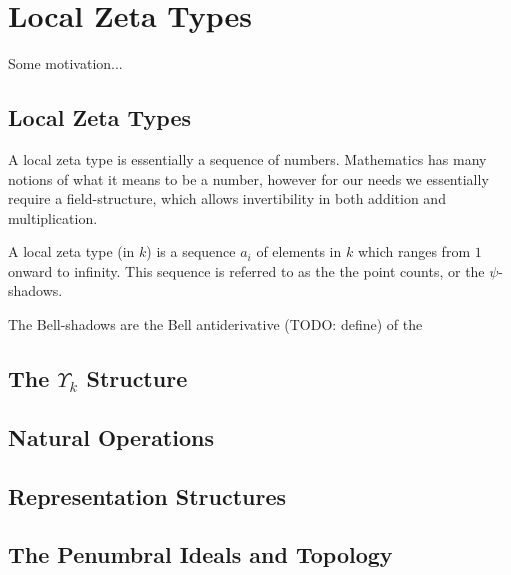 \section{Local Zeta Types}
Some motivation...

\subsection{Local Zeta Types}
A local zeta type is essentially a sequence of numbers. Mathematics has many notions of what it means to be a number, however for our needs we essentially require a field-structure, which allows invertibility in both addition and multiplication. 

\begin{definition}
  A local zeta type (in $k$) is a sequence $a_i$ of elements in $k$ which ranges from $1$ onward to infinity. This sequence is referred to as the the point counts, or the $\psi$-shadows.
\end{definition}

\begin{definition}
  The Bell-shadows are the Bell antiderivative (TODO: define) of the 
\end{definition}

\subsection{The $\Upsilon_k$ Structure}

\subsection{Natural Operations}

\subsection{Representation Structures}

\subsection{The Penumbral Ideals and Topology}

